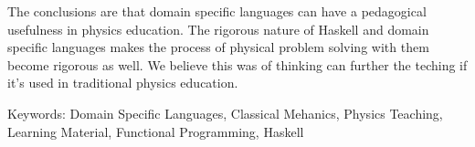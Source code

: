 The conclusions are that domain specific languages can have a pedagogical usefulness in physics education. The rigorous nature of Haskell and domain specific languages makes the process of physical problem solving with them become rigorous as well. We believe this was of thinking can further the teching if it's used in traditional physics education.













\vfill
Keywords: Domain Specific Languages, Classical Mehanics, Physics Teaching, Learning Material, Functional Programming, Haskell


\newpage				%
\thispagestyle{empty}
\mbox{}
